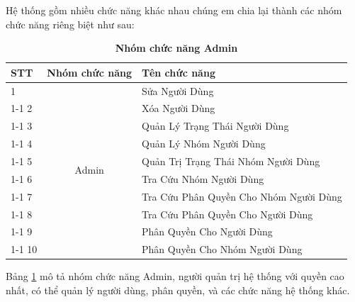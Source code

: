 \documentclass{article} %
\begin{document}
Hệ thống gồm nhiều chức năng khác nhau chúng em chia lại thành các nhóm chức năng riêng biệt như sau:

\begin{table}[H]
    \centering    
    \caption[Nhóm chức năng Admin]{\bfseries\fontsize{12pt}{0pt}\selectfont Nhóm chức năng Admin}
    \begin{tabular}{|l|c|l|}
        \hline
        \textbf{STT} & \multicolumn{1}{l|}{\textbf{Nhóm chức năng}} & \textbf{Tên chức năng}                 \\ \hline
        1            & \multirow{10}{*}{Admin}                      & Sửa Người Dùng                         \\ \cline{1-1} \cline{3-3} 
        2            &                                              & Xóa Người Dùng                         \\ \cline{1-1} \cline{3-3} 
        3            &                                              & Quản Lý Trạng Thái Người Dùng          \\ \cline{1-1} \cline{3-3} 
        4            &                                              & Quản Lý Nhóm Người Dùng                \\ \cline{1-1} \cline{3-3} 
        5            &                                              & Quản Trị Trạng Thái Nhóm Người Dùng    \\ \cline{1-1} \cline{3-3} 
        6            &                                              & Tra Cứu Nhóm Người Dùng                \\ \cline{1-1} \cline{3-3} 
        7            &                                              & Tra Cứu Phân Quyền Cho Nhóm Người Dùng \\ \cline{1-1} \cline{3-3} 
        8            &                                              & Tra Cứu Phân Quyền Cho Người Dùng      \\ \cline{1-1} \cline{3-3} 
        9            &                                              & Phân Quyền Cho Người Dùng              \\ \cline{1-1} \cline{3-3} 
        10           &                                              & Phân Quyền Cho Nhóm Người Dùng         \\ \hline
        \end{tabular}
        \label{tab:admin}
\end{table}

Bảng \ref{tab:admin} mô tả nhóm chức năng Admin, người quản trị hệ thống với quyền cao nhất, có thể quản lý người dùng, phân quyền, và các chức năng hệ thống khác.
\end{document}

